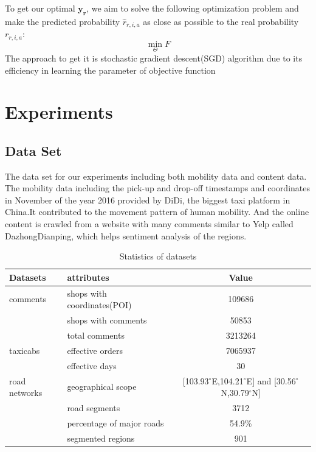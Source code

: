 \documentclass[runningheads]{llncs}
\begin{document}
To get our optimal $\bm{y_r}$, we aim to solve the following optimization problem and make the predicted probability $\hat{r}_{r,i,a}$ as close as possible to the real probability$r_{r,i,a}$:
$$\min\limits_{\Theta} F$$
The approach to get it is stochastic gradient descent(SGD) algorithm due to its efficiency in learning the parameter of objective function























\section{Experiments}
\subsection{Data Set}
The data set for our experiments including both mobility data and content data.
The mobility data including the pick-up and drop-off timestamps and coordinates in November of the year 2016 provided by DiDi, the biggest taxi platform in China.It contributed to the movement pattern of human mobility.
And the online content is crawled from a website with many comments similar to Yelp called DazhongDianping, which helps sentiment analysis of the regions.
\begin{table}[h]
\caption{Statistics of datasets}\label{dataset}
\begin{tabular}{|l|l|c|}
\hline
Datasets &  attributes & Value\\
\hline
comments & shops with coordinates(POI) & 109686\\
 & shops with comments & 50853\\
 & total comments & 3213264\\
\hline
taxicabs & effective orders & 7065937\\
 & effective days & 30 \\
\hline
road networks & geographical scope & [103.93$^\circ$E,104.21$^\circ$E] and [30.56$^\circ$N,30.79$^\circ$N]\\
 & road segments & 3712\\
 & percentage of major roads & 54.9\%\\
 & segmented regions & 901\\
\hline
\end{tabular}
\end{table}
\end{document}
